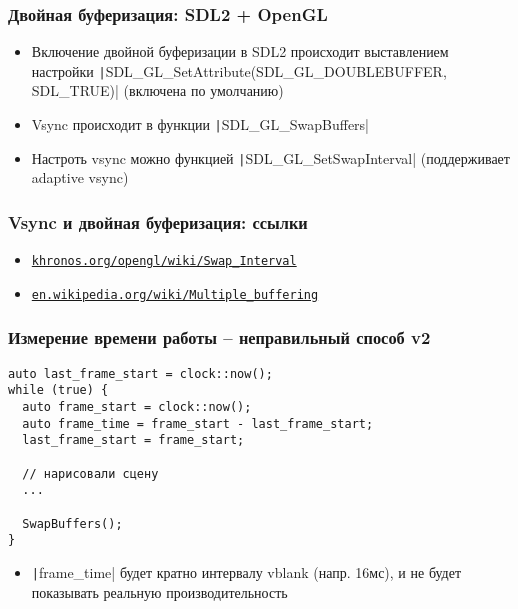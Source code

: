 \documentclass{beamer}
\begin{document}
\begin{frame}[fragile]
\frametitle{Двойная буферизация: SDL2 + OpenGL}
\begin{itemize}
\item Включение двойной буферизации в SDL2 происходит выставлением настройки \texttt|SDL_GL_SetAttribute(SDL_GL_DOUBLEBUFFER, SDL_TRUE)| (включена по умолчанию)
\pause
\item Vsync происходит в функции \texttt|SDL_GL_SwapBuffers|
\pause
\item Настроть vsync можно функцией \texttt|SDL_GL_SetSwapInterval| (поддерживает adaptive vsync)
\end{itemize}
\end{frame}

\begin{frame}[fragile]
\frametitle{Vsync и двойная буферизация: ссылки}
\begin{itemize}
\item \href{https://www.khronos.org/opengl/wiki/Swap_Interval}{\texttt{khronos.org/opengl/wiki/Swap\_Interval}}
\item \href{https://en.wikipedia.org/wiki/Multiple_buffering#Double_buffering_in_computer_graphics}{\texttt{en.wikipedia.org/wiki/Multiple\_buffering}}
\end{itemize}
\end{frame}

\begin{frame}[fragile]
\frametitle{Измерение времени работы -- неправильный способ v2}
\begin{verbatim}
auto last_frame_start = clock::now();
while (true) {
  auto frame_start = clock::now();
  auto frame_time = frame_start - last_frame_start;
  last_frame_start = frame_start;

  // нарисовали сцену
  ...

  SwapBuffers();
}
\end{verbatim}
\pause
\begin{itemize}
\item \texttt|frame_time| будет кратно интервалу vblank (напр. 16мс), и не будет показывать реальную производительность
\end{itemize}
\end{frame}
\end{document}

